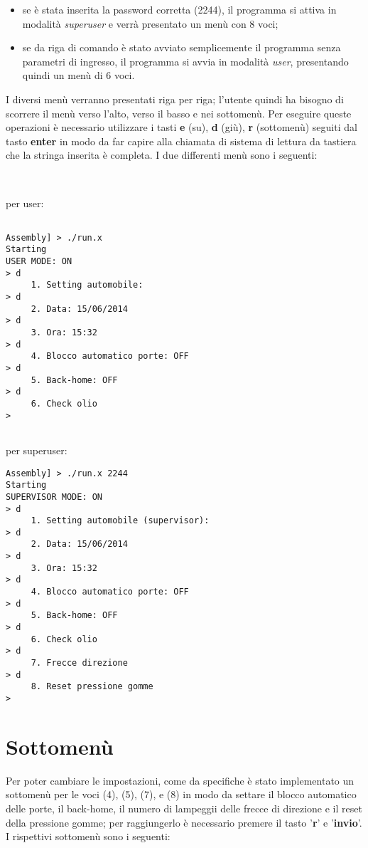 \documentclass[a4paper,titlepage]{book}
\begin{document}
\begin{itemize}

\item se è stata inserita la password corretta (2244), il programma si attiva in modalità \textit{superuser} e verrà presentato un menù con 8 voci;
\item se da riga di comando è stato avviato semplicemente il programma senza parametri di ingresso, il programma si avvia in modalità \textit{user}, presentando quindi un menù di 6 voci.

\end{itemize}

I diversi menù verranno presentati riga per riga; l'utente quindi ha bisogno di scorrere il menù verso l'alto, verso il basso e nei sottomenù. Per eseguire queste operazioni è necessario utilizzare i tasti \textbf{e} (su), \textbf{d} (giù), \textbf{r} (sottomenù) seguiti dal tasto \textbf{enter} in modo da far capire alla chiamata di sistema di lettura da tastiera che la stringa inserita è completa.
I due differenti menù sono i seguenti:

~

per user:
\begin{lstlisting}

Assembly] > ./run.x 
Starting
USER MODE: ON
> d
     1. Setting automobile:
> d
     2. Data: 15/06/2014
> d
     3. Ora: 15:32
> d
     4. Blocco automatico porte: OFF
> d
     5. Back-home: OFF
> d
     6. Check olio
>  


\end{lstlisting} 

\newpage
per superuser:
\begin{lstlisting}
Assembly] > ./run.x 2244
Starting
SUPERVISOR MODE: ON
> d
     1. Setting automobile (supervisor):
> d
     2. Data: 15/06/2014
> d
     3. Ora: 15:32
> d
     4. Blocco automatico porte: OFF
> d
     5. Back-home: OFF
> d
     6. Check olio
> d
     7. Frecce direzione
> d
     8. Reset pressione gomme
> 

\end{lstlisting}


\section{Sottomenù}

Per poter cambiare le impostazioni, come da specifiche è stato implementato un sottomenù per le voci (4), (5), (7), e (8) in modo da settare il blocco automatico delle porte, il back-home, il numero di lampeggii delle frecce di direzione e il reset della pressione gomme; per raggiungerlo è necessario premere il tasto '\textbf{r}' e '\textbf{invio}'. I rispettivi sottomenù sono i seguenti:
\end{document}
